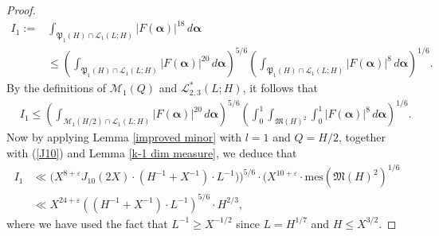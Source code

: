 \documentclass{amsart}%
\numberwithin{equation}{section}
\theoremstyle{remark}
\newcommand{\1}{\mathbbm{1}}
\newcommand{\balp}{\boldsymbol{\alpha}}
\begin{document}
\begin{proof}
\begin{equation}
\begin{aligned} 
I_1 := &\int_{\mathfrak{P}_1(H)\cap \mathcal{L}_{1}(L;H)}|F(\boldsymbol{\alpha})|^{18}\, d\balp \\
    & \le  \left(\int_{\mathfrak{P}_1(H)\cap \mathcal{L}_{1}(L;H)}|F(\boldsymbol{\alpha})|^{20}\, d\balp\right)^{5/6}\left(\int_{\mathfrak{P}_1(H)\cap \mathcal{L}_{1}(L;H)}|F(\boldsymbol{\alpha})|^{8}\, d\balp\right)^{1/6}.
\end{aligned}
\end{equation}
By the definitions of $\mathcal{M}_1(Q)$ and $\mathcal{L}^*_{2,3}(L;H)$, it follows that
\begin{equation}\label{mean value over the secondary minor arcs2}
    \begin{aligned}
     & I_1 \le \left(\int_{\mathcal{M}_1(H/2)\cap  \mathcal{L}_{1}(L;H)}|F(\boldsymbol{\alpha})|^{20}\, d\balp\right)^{5/6}\left(\int_0^1\int_{\mathfrak{M}(H)^2}\int_0^1|F(\boldsymbol{\alpha})|^{8}\, d\balp\right)^{1/6}.
    \end{aligned}
\end{equation}
Now by applying Lemma \ref{improved minor} with $l=1$ and $Q=H/2$, together with (\ref{J10}) and Lemma \ref{k-1 dim measure}, we deduce that
\begin{equation}\label{final bound 1}
    \begin{aligned}
         I_1  &\ll \bigl(X^{8+\varepsilon}J_{10}(2X)\cdot \left(H^{-1}+X^{-1}\right)\cdot L^{-1}\bigr)\bigr)^{5/6}\cdot (X^{10+\varepsilon}\cdot \text{mes}(\mathfrak{M}(H)^2)^{1/6}\\
   & \ll X^{24+\varepsilon}\left(\left(H^{-1}+X^{-1}\right)\cdot L^{-1}\right)^{5/6}\cdot H^{2/3},
    \end{aligned}
\end{equation}
where we have used the fact that $L^{-1}\geq X^{-1/2}$ since $L=H^{1/7}$ and $H\leq X^{3/2}.$


\end{proof}
\end{document}
